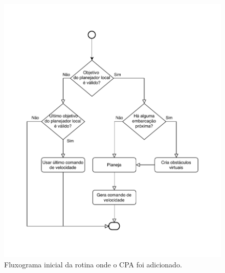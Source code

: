     
    \begin{figure}
        \centering
        \includegraphics{fig/chap4/find_best_path_diagram_no_cpa.pdf}
        \caption{Fluxograma inicial da rotina onde o CPA foi adicionado.}
        \label{fig:chap4_fluxograma_inicial}
    \end{figure}
    

